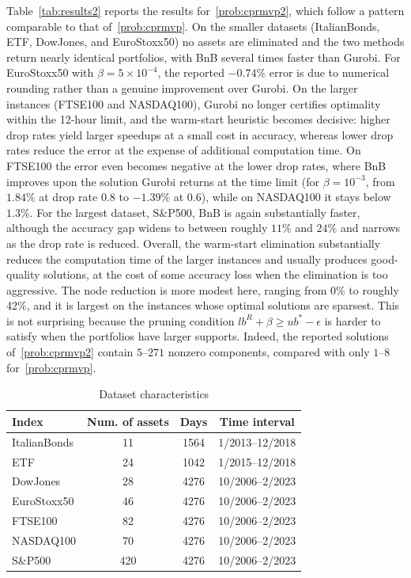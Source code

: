 \documentclass[11pt]{article}
\theoremstyle{plain}
\theoremstyle{definition}
\theoremstyle{plain}
\begin{document}
Table~\ref{tab:results2} reports the results for~\eqref{prob:cprmvp2}, which follow a pattern comparable to that of~\eqref{prob:cprmvp}. On the smaller datasets (ItalianBonds, ETF, DowJones, and EuroStoxx50) no assets are eliminated and the two methods return nearly identical portfolios, with BnB several times faster than Gurobi. For EuroStoxx50 with $\beta=5\times10^{-4}$, the reported $-0.74\%$ error is due to numerical rounding rather than a genuine improvement over Gurobi. On the larger instances (FTSE100 and NASDAQ100), Gurobi no longer certifies optimality within the 12-hour limit, and the warm-start heuristic becomes decisive: higher drop rates yield larger speedups at a small cost in accuracy, whereas lower drop rates reduce the error at the expense of additional computation time. On FTSE100 the error even becomes negative at the lower drop rates, where BnB improves upon the solution Gurobi returns at the time limit (for $\beta=10^{-3}$, from $1.84\%$ at drop rate $0.8$ to $-1.39\%$ at $0.6$), while on NASDAQ100 it stays below $1.3\%$. For the largest dataset, S\&P500, BnB is again substantially faster, although the accuracy gap widens to between roughly $11\%$ and $24\%$ and narrows as the drop rate is reduced. Overall, the warm-start elimination substantially reduces the computation time of the larger instances and usually produces good-quality solutions, at the cost of some accuracy loss when the elimination is too aggressive. The node reduction is more modest here, ranging from 0\% to roughly 42\%, and it is largest on the instances whose optimal solutions are sparsest. This is not surprising because the pruning condition $lb^R+\beta\geq ub^*-\epsilon$ is harder to satisfy when the portfolios have larger supports. Indeed, the reported solutions of~\eqref{prob:cprmvp2} contain $5$--$271$ nonzero components, compared with only $1$--$8$ for~\eqref{prob:cprmvp}.
\begin{table}[!htbp]
\centering
\fontsize{10}{12}\selectfont
\caption{Dataset characteristics}
\label{tab:datasets}
\begin{tabular}{lccc}
\hline
\textbf{Index} & \textbf{Num. of assets} & \textbf{Days} & \textbf{Time interval} \\
\hline
ItalianBonds      & 11 & 1564  & 1/2013--12/2018 \\
ETF & 24 & 1042 &  1/2015--12/2018 \\
DowJones  & 28  & 4276 & 10/2006--2/2023 \\
EuroStoxx50      & 46 & 4276  & 10/2006--2/2023 \\
FTSE100      & 82 & 4276  & 10/2006--2/2023 \\
NASDAQ100      & 70 & 4276  & 10/2006--2/2023 \\
S\&P500      & 420 & 4276  & 10/2006--2/2023 \\
\hline
\end{tabular}
\end{table}
\end{document}
